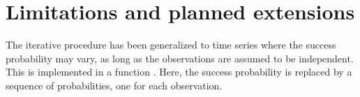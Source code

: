 \section{Limitations and planned extensions}

The iterative procedure has been generalized to time series where the success probability may vary, as long as the observations are assumed to be independent. 
This is implemented in a function . Here, the success probability is replaced by a sequence of probabilities, one for each observation. 

